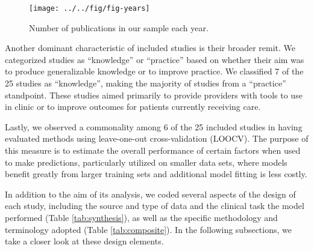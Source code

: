 \documentclass[preprint, 3p,
authoryear]{elsarticle} %
\begin{document}
\begin{figure}

{\centering \texttt{[image: ../../fig/fig-years]} 

}

\caption{\label{fig:year}Number of publications in our sample each year.}\label{fig:fig:year}
\end{figure}

Another dominant characteristic of included studies is their broader
remit. We categorized studies as ``knowledge'' or ``practice'' based on
whether their aim was to produce generalizable knowledge or to improve
practice. We classified 7 of the 25 studies as ``knowledge'', making the
majority of studies from a ``practice'' standpoint. These studies aimed
primarily to provide providers with tools to use in clinic or to improve
outcomes for patients currently receiving care.

Lastly, we observed a commonality among 6 of the 25 included studies in
having evaluated methods using leave-one-out cross-validation (LOOCV).
The purpose of this measure is to estimate the overall performance of
certain factors when used to make predictions, particularly utilized on
smaller data sets, where models benefit greatly from larger training
sets and additional model fitting is less costly.

In addition to the aim of its analysis, we coded several aspects of the
design of each study, including the source and type of data and the
clinical task the model performed (Table \ref{tab:synthesis}), as well
as the specific methodology and terminology adopted (Table
\ref{tab:composite}). In the following subsections, we take a closer
look at these design elements.
\end{document}
